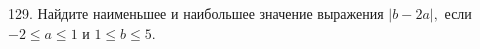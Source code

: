 129. Найдите наименьшее и наибольшее значение выражения $|b-2a|,$ если $-2\leqslant a \leqslant 1$ и $1\leqslant b \leqslant 5.$\\
